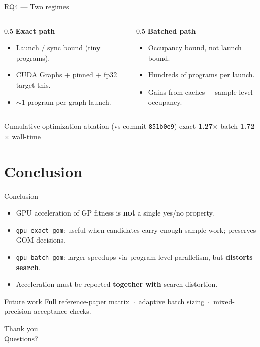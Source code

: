 \documentclass[aspectratio=169,11pt]{beamer}
\newcommand{\exactgpu}{\texttt{gpu\_exact\_gom}}
\newcommand{\batchgpu}{\texttt{gpu\_batch\_gom}}
\begin{document}
\begin{frame}{RQ4 — Two regimes}
  \begin{columns}[T]
    \begin{column}{0.5\textwidth}
      \textbf{Exact path}
      \begin{itemize}\small
        \item Launch / sync bound (tiny programs).
        \item CUDA Graphs + pinned + fp32 target this.
        \item $\sim$1 program per graph launch.
      \end{itemize}
    \end{column}
    \begin{column}{0.5\textwidth}
      \textbf{Batched path}
      \begin{itemize}\small
        \item Occupancy bound, not launch bound.
        \item Hundreds of programs per launch.
        \item Gains from caches + sample-level occupancy.
      \end{itemize}
    \end{column}
  \end{columns}
  \vfill
  \centering
  \begin{block}{Cumulative optimization ablation (vs commit \texttt{851b0e9})}
    \centering exact \textbf{1.27$\times$} \qquad batch \textbf{1.72$\times$} wall-time
  \end{block}
\end{frame}

\section{Conclusion}

\begin{frame}{Conclusion}
  \begin{itemize}
    \item GPU acceleration of GP fitness is \textbf{not} a single yes/no property.
    \item \exactgpu: useful when candidates carry enough sample work; preserves GOM decisions.
    \item \batchgpu: larger speedups via program-level parallelism, but \textbf{distorts search}.
    \item Acceleration must be reported \textbf{together with} search distortion.
  \end{itemize}
  \vfill
  \begin{exampleblock}{Future work}
    \small Full reference-paper matrix \,$\cdot$\, adaptive batch sizing \,$\cdot$\, mixed-precision acceptance checks.
  \end{exampleblock}
\end{frame}

\begin{frame}[plain]
  \centering
  \vfill
  {\Large Thank you}\\[1em]
  {\normalsize Questions?}
  \vfill
\end{frame}
\end{document}
